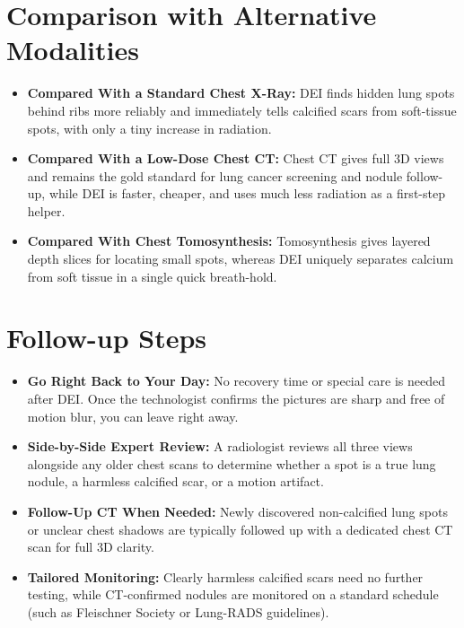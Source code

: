 \section{Comparison with Alternative Modalities}
\begin{itemize}
    \item \textbf{Compared With a Standard Chest X-Ray:} DEI finds hidden lung spots behind ribs more reliably and immediately tells calcified scars from soft-tissue spots, with only a tiny increase in radiation.
    \item \textbf{Compared With a Low-Dose Chest CT:} Chest CT gives full 3D views and remains the gold standard for lung cancer screening and nodule follow-up, while DEI is faster, cheaper, and uses much less radiation as a first-step helper.
    \item \textbf{Compared With Chest Tomosynthesis:} Tomosynthesis gives layered depth slices for locating small spots, whereas DEI uniquely separates calcium from soft tissue in a single quick breath-hold.
\end{itemize}

\section{Follow-up Steps}
\begin{itemize}
    \item \textbf{Go Right Back to Your Day:} No recovery time or special care is needed after DEI. Once the technologist confirms the pictures are sharp and free of motion blur, you can leave right away.
    \item \textbf{Side-by-Side Expert Review:} A radiologist reviews all three views alongside any older chest scans to determine whether a spot is a true lung nodule, a harmless calcified scar, or a motion artifact.
    \item \textbf{Follow-Up CT When Needed:} Newly discovered non-calcified lung spots or unclear chest shadows are typically followed up with a dedicated chest CT scan for full 3D clarity.
    \item \textbf{Tailored Monitoring:} Clearly harmless calcified scars need no further testing, while CT-confirmed nodules are monitored on a standard schedule (such as Fleischner Society or Lung-RADS guidelines).
\end{itemize}

